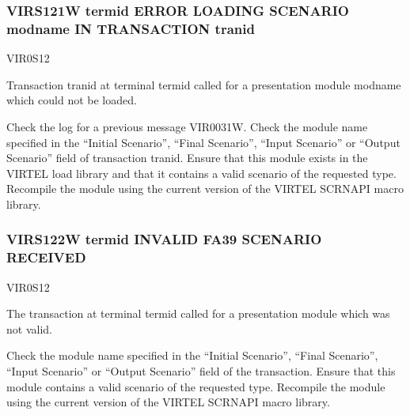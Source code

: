 \documentclass[letterpaper,10pt,english]{sphinxmanual}
\begin{document}
\subsubsection{VIRS121W termid ERROR LOADING SCENARIO modname IN TRANSACTION tranid}
\label{\detokenize{messages:virs121w-termid-error-loading-scenario-modname-in-transaction-tranid}}\begin{description}
\sphinxAtStartPar
VIR0S12

\sphinxAtStartPar
Transaction tranid at terminal termid called for a presentation module modname which could not be loaded.

\sphinxAtStartPar
Check the log for a previous message VIR0031W. Check the module name specified in the “Initial Scenario”, “Final Scenario”, “Input Scenario” or “Output Scenario” field of transaction tranid. Ensure that this module exists in the VIRTEL load library and that it contains a valid scenario of the requested type. Recompile the module using the current version of the VIRTEL SCRNAPI macro library.

\end{description}


\subsubsection{VIRS122W termid INVALID FA39 SCENARIO RECEIVED}
\label{\detokenize{messages:virs122w-termid-invalid-fa39-scenario-received}}\begin{description}
\sphinxAtStartPar
VIR0S12

\sphinxAtStartPar
The transaction at terminal termid called for a presentation module which was not valid.

\sphinxAtStartPar
Check the module name specified in the “Initial Scenario”, “Final Scenario”, “Input Scenario” or “Output Scenario” field of the transaction. Ensure that this module contains a valid scenario of the requested type. Recompile the module using the current version of the VIRTEL SCRNAPI macro library.

\end{description}
\end{document}
